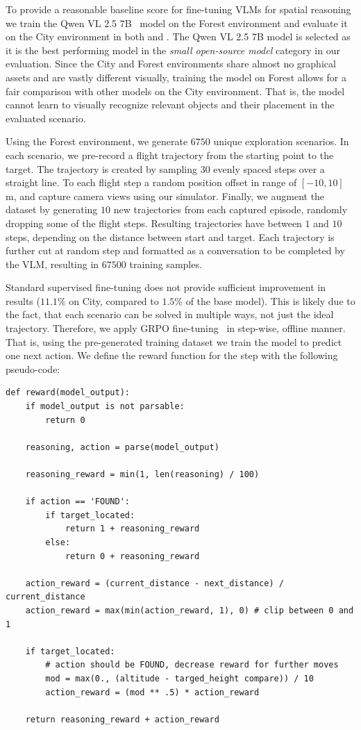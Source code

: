 To provide a reasonable baseline score for fine-tuning VLMs for spatial reasoning we train the Qwen VL 2.5 7B~\cite{bai2025qwen2} model on the Forest environment and evaluate it on the City environment in both \challenge{} and \hardchallenge{}. The Qwen VL 2.5 7B model is selected as it is the best performing model in the \textit{small open-source model} category in our evaluation. Since the City and Forest environments share almost no graphical assets and are vastly different visually, training the model on Forest allows for a fair comparison with other models on the City environment. That is, the model cannot learn to visually recognize relevant objects and their placement in the evaluated scenario.

Using the Forest environment, we generate $6750$ unique exploration scenarios. In each scenario, we pre-record a flight trajectory from the starting point to the target. The trajectory is created by sampling $30$ evenly spaced steps over a straight line. To each flight step a random position offset in range of $[-10, 10]$ m, and capture camera views using our simulator. Finally, we augment the dataset by generating $10$ new trajectories from each captured episode, randomly dropping some of the flight steps. Resulting trajectories have between $1$ and $10$ steps, depending on the distance between start and target. Each trajectory is further cut at random step and formatted as a conversation to be completed by the VLM, resulting in $67500$ training samples.

Standard supervised fine-tuning does not provide sufficient improvement in results ($11.1\%$ on \challenge{} City, compared to $1.5\%$ of the base model). This is likely due to the fact, that each scenario can be solved in multiple ways, not just the ideal trajectory. Therefore, we apply GRPO fine-tuning~\cite{shao2024deepseekmath} in step-wise, offline manner. That is, using the pre-generated training dataset we train the model to predict one next action. We define the reward function for the step with the following pseudo-code:

\begin{lstlisting}[caption=Reward for GRPO fine-tuning (pseudo-code).,label={lst:rewardgrpo}]
def reward(model_output):
    if model_output is not parsable:
        return 0
        
    reasoning, action = parse(model_output)
    
    reasoning_reward = min(1, len(reasoning) / 100)

    if action == 'FOUND':
        if target_located:
            return 1 + reasoning_reward
        else:
            return 0 + reasoning_reward

    action_reward = (current_distance - next_distance) / current_distance
    action_reward = max(min(action_reward, 1), 0) # clip between 0 and 1

    if target_located:
        # action should be FOUND, decrease reward for further moves
        mod = max(0., (altitude - targed_height compare)) / 10
        action_reward = (mod ** .5) * action_reward

    return reasoning_reward + action_reward
\end{lstlisting}

